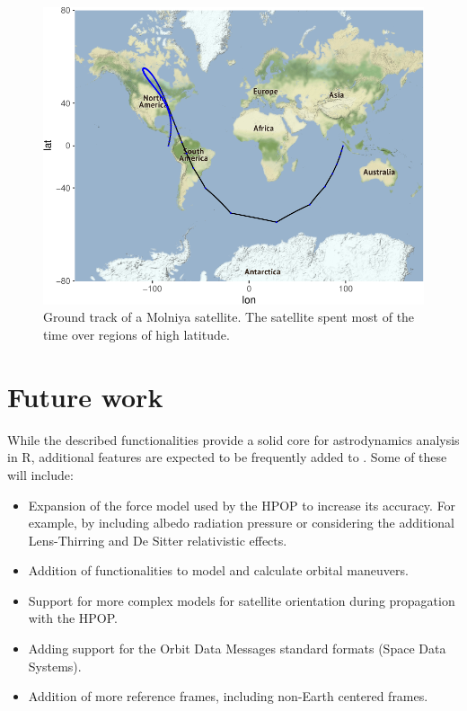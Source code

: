\begin{figure}[H]
\includegraphics[width=1\linewidth]{ayala2021b_files/figure-latex/groundtrack-Molniya-1} \caption{Ground track of a Molniya satellite. The satellite spent most of the time over regions of high latitude.}\label{fig:groundtrack-Molniya}
\end{figure}

\hypertarget{future-work}{%
\section{Future work}\label{future-work}}

While the described functionalities provide a solid core for astrodynamics analysis in R, additional features are expected to be frequently added to . Some of these will include:

\begin{itemize}
\tightlist
\item
  Expansion of the force model used by the HPOP to increase its accuracy. For example, by including albedo radiation pressure or considering the additional Lens-Thirring and De Sitter relativistic effects.
\item
  Addition of functionalities to model and calculate orbital maneuvers.
\item
  Support for more complex models for satellite orientation during propagation with the HPOP.
\item
  Adding support for the Orbit Data Messages standard formats (Space Data Systems).
\item
  Addition of more reference frames, including non-Earth centered frames.
\end{itemize}


